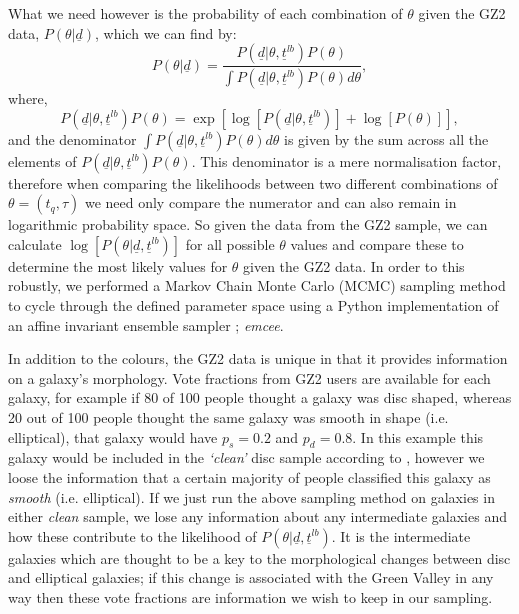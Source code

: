 \documentclass{mn2e}
\begin{document}
What we need however is the probability of each combination of $\theta$ given the GZ2 data, $P(\theta|\underline{d})$, which we can find by:
\begin{equation*}
P(\theta|\underline{d}) = \frac{P(\underline{d}|\theta, \underline{t}^{lb})P(\theta)}{\int P(\underline{d}|\theta, \underline{t}^{lb})P(\theta) d\theta},
\end{equation*}
where,
\begin{equation*}
P(\underline{d}|\theta, \underline{t}^{lb})P(\theta) = \exp{\left[\log{[P(\underline{d}|\theta, \underline{t}^{lb})]} + \log{[P(\theta)]}\right]},
\end{equation*}
and the denominator $\int P(\underline{d}|\theta, \underline{t}^{lb})P(\theta) d\theta$ is given by the sum across all the elements of $P(\underline{d}|\theta, \underline{t}^{lb})P(\theta)$. This denominator is a mere normalisation factor, therefore when comparing the likelihoods between two different combinations of $\theta = (t_{q}, \tau)$ we need only compare the numerator and can also remain in logarithmic probability space. So given the data from the GZ2 sample, we can calculate $\log[P(\theta|\underline{d}, \underline{t}^{lb})]$ for all possible $\theta$ values and compare these to determine the most likely values for $\theta$ given the GZ2 data. In order to this robustly, we performed a Markov Chain Monte Carlo (MCMC) sampling method to cycle through the defined parameter space using a Python implementation of an affine invariant ensemble sampler \cite{Dan}; \emph{emcee}.

In addition to the colours, the GZ2 data is unique in that it provides information on a galaxy's morphology. Vote fractions from GZ2 users are available for each galaxy, for example if 80 of 100 people thought a galaxy was disc shaped, whereas 20 out of 100 people thought the same galaxy was smooth in shape (i.e. elliptical), that galaxy would have $p_{s} = 0.2$ and $p_{d} = 0.8$. In this example this galaxy would be included in the \emph{`clean'} disc sample according to \cite{GZ2}, however we loose the information that a certain majority of people classified this galaxy as \emph{smooth} (i.e. elliptical). If we just run the above sampling method on galaxies in either \emph{clean} sample, we lose any information about any intermediate galaxies and how these contribute to the likelihood of $P(\theta|\underline{d}, \underline{t}^{lb})$. It is the intermediate galaxies which are thought to be a key to the morphological changes between disc and elliptical galaxies; if this change is associated with the Green Valley in any way then these vote fractions are information we wish to keep in our sampling. 
\end{document}
